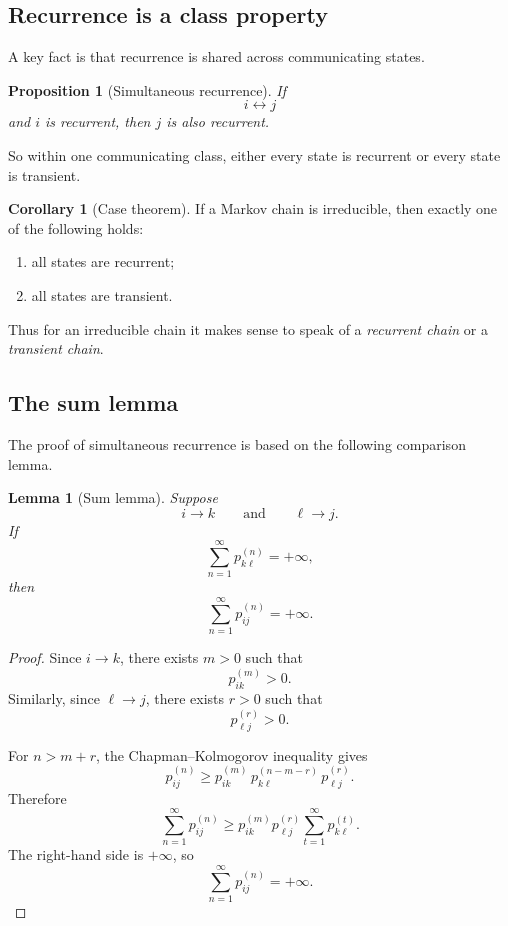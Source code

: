 \documentclass[11pt]{article}
\newtheorem{proposition}[theorem]{Proposition}
\newtheorem{lemma}[theorem]{Lemma}
\theoremstyle{definition}
\newtheorem{corollary}[theorem]{Corollary}
\begin{document}
\subsection{Recurrence is a class property}

A key fact is that recurrence is shared across communicating states.

\begin{proposition}[Simultaneous recurrence]
If
\[
i\leftrightarrow j
\]
and \(i\) is recurrent, then \(j\) is also recurrent.
\end{proposition}

So within one communicating class, either every state is recurrent or every state is transient.

\begin{corollary}[Case theorem]
If a Markov chain is irreducible, then exactly one of the following holds:
\begin{enumerate}[label=(\roman*)]
    \item all states are recurrent;
    \item all states are transient.
\end{enumerate}
\end{corollary}

Thus for an irreducible chain it makes sense to speak of a \emph{recurrent chain} or a \emph{transient chain}.

\subsection{The sum lemma}

The proof of simultaneous recurrence is based on the following comparison lemma.

\begin{lemma}[Sum lemma]
Suppose
\[
i\to k
\qquad\text{and}\qquad
\ell\to j.
\]
If
\[
\sum_{n=1}^\infty p_{k\ell}^{(n)}=+\infty,
\]
then
\[
\sum_{n=1}^\infty p_{ij}^{(n)}=+\infty.
\]
\end{lemma}

\begin{proof}
Since \(i\to k\), there exists \(m>0\) such that
\[
p_{ik}^{(m)}>0.
\]
Similarly, since \(\ell\to j\), there exists \(r>0\) such that
\[
p_{\ell j}^{(r)}>0.
\]

For \(n>m+r\), the Chapman--Kolmogorov inequality gives
\[
p_{ij}^{(n)}
\ge
p_{ik}^{(m)}\,p_{k\ell}^{(n-m-r)}\,p_{\ell j}^{(r)}.
\]
Therefore
\[
\sum_{n=1}^\infty p_{ij}^{(n)}
\ge
p_{ik}^{(m)}p_{\ell j}^{(r)}
\sum_{t=1}^\infty p_{k\ell}^{(t)}.
\]
The right-hand side is \(+\infty\), so
\[
\sum_{n=1}^\infty p_{ij}^{(n)}=+\infty.
\]
\end{proof}
\end{document}
